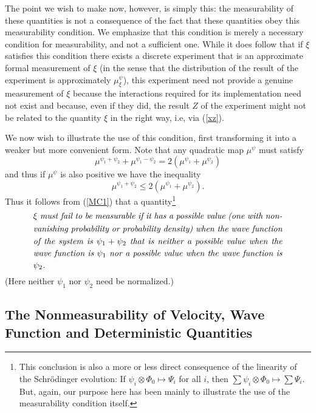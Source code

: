 \documentclass[12pt]{article}
\newcommand{\eq}[1]{(\ref{#1})}
\begin{document}
The point we wish to make now, however, is simply this: the
measurability of these quantities is not a consequence of the fact
that these quantities obey this measurability condition. We emphasize
that this condition is merely a necessary condition for measurability,
and not a sufficient one. While it does follow that if $\xi$ satisfies
this condition there exists a discrete experiment that is an
approximate formal measurement of $\xi$ (in the sense that the
distribution of the result of the experiment is approximately $
\mu_{\xi}^{\psi}$), this experiment need not provide a genuine
measurement of $\xi$ because the interactions required for its
implementation need not exist and because, even if they did, the
result $Z$ of the experiment might not be related to the quantity
$\xi$ in the right way, i.e, via (\ref{xz}).

We now wish to illustrate the use of this condition, first
transforming it into a weaker but more convenient form. Note that any
quadratic map $\mu^\psi$ must satisfy
\[
\mu^{\psi_1 + \psi_2} + \mu^{\psi_1 - \psi_2} = 2(\mu^{\psi_1} +
\mu^{\psi_2})
\]
and thus if $\mu^\psi$ is also positive we have the inequality
\begin{equation}\label{ineq} \mu^{\psi_1+\psi_2} \le 2(\mu^{\psi_1} +
\mu^{\psi_2}).
\end{equation}
Thus it follows {}from \eq{MC1} that a quantity\footnote{This
   conclusion is also a more or less direct consequence of the
   linearity of the Schr\"odinger evolution: If
   $\psi_i\otimes\Phi_0\mapsto\Psi_i$ for all $i$, then
   $\sum\psi_i\otimes\Phi_0\mapsto\sum\Psi_i$. But, again, our purpose
   here has been mainly to illustrate the use of the measurability
   condition itself.}
\begin{equation}
\mbox{%
\begin{minipage}{0.85\textwidth}\openup 1.4\jot
   \setlength{\baselineskip}{12pt}\emph{$\xi$ must fail to be
     measurable if it has a possible value (one with nonvanishing
     probability or probability density) when the wave function of the
     system is $\psi_1+ \psi_2$ that is neither a possible value when
     the wave function is $\psi_1$ nor a possible value when the wave
     function is $\psi_2$. }
\end{minipage}}
\label{MC2}
\end{equation}
(Here neither $\psi_1$ nor $\psi_2$ need be normalized.)


\subsection{The Nonmeasurability of Velocity, Wave Function and
   Deterministic Quantities}\label{vwf}
\end{document}
